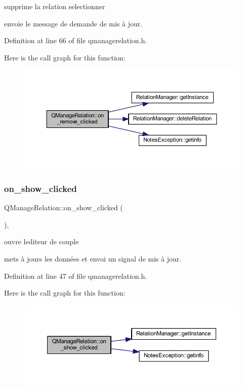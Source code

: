 supprime la relation selectionner 

envoie le message de demande de mis à jour. 

Definition at line 66 of file qmanagerelation.\+h.

Here is the call graph for this function\+:\nopagebreak
\begin{figure}[H]
\begin{center}
\leavevmode
\includegraphics[width=350pt]{class_q_manage_relation_a0ad8c5f51b68248b2d42e980d99e4820_cgraph}
\end{center}
\end{figure}
\mbox{\label{class_q_manage_relation_ab901c21b731bde77d9c1bc68780ec700}} 
\subsubsection{\texorpdfstring{on\+\_\+show\+\_\+clicked}{on\_show\_clicked}}
{\footnotesize\ttfamily Q\+Manage\+Relation\+::on\+\_\+show\+\_\+clicked (\begin{DoxyParamCaption}{ }\end{DoxyParamCaption})\hspace{0.3cm}{\ttfamily [inline]}, {\ttfamily [slot]}}



ouvre l\textquotesingle{}editeur de couple 

mets à jours les données et envoi un signal de mis à jour. 

Definition at line 47 of file qmanagerelation.\+h.

Here is the call graph for this function\+:\nopagebreak
\begin{figure}[H]
\begin{center}
\leavevmode
\includegraphics[width=350pt]{class_q_manage_relation_ab901c21b731bde77d9c1bc68780ec700_cgraph}
\end{center}
\end{figure}


